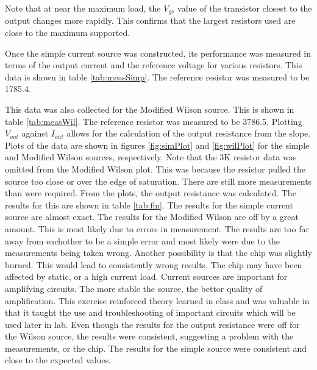 Note that at near the maximum load, the $V_{gs}$ value of the transistor closest to the output changes more rapidly. This confirms that the largest resistors used are close to the maximum supported. 

Once the simple current source was constructed, its performance was measured in terms of the output current and the reference voltage for various resistors. This data is shown in table \ref{tab:measSimp}. The reference resistor was measured to be 1785.4\ohm. 

This data was also collected for the Modified Wilson source. This is shown in table \ref{tab:measWil}. The reference resistor was measured to be 3786.5\ohm. 
Plotting $V_{out}$ against $I_{out}$ allows for the calculation of the output resistance from the slope. Plots of the data are shown in figures \ref{fig:simPlot} and \ref{fig:wilPlot} for the simple and Modified Wilson sources, respectively. 
Note that the 3K resistor data was omitted from the Modified Wilson plot. This was because the resistor pulled the source too close or over the edge of saturation. There are still more measurements than were required. 
From the plots, the output resistance was calculated. The results for this are shown in table \ref{tab:fin}.
The results for the simple current source are almost exact. The results for the  Modified Wilson are off by a great amount. This is most likely due to errors in measurement. The results are too far away from eachother to be a simple error and most likely were due to the measurements being taken wrong. 
Another possibility is that the chip was slightly burned. This would lead to consistently wrong results. The chip may have been affected by static, or a high current load. 
Current sources are important for amplifying circuits. The more stable the source, the bettor quality of amplification. This exercise reinforced theory learned in class and was valuable in that it taught the use and troubleshooting of important circuits which will be used later in lab. 
Even though the results for the output resistance were off for the Wilson source, the results were consistent, suggesting a problem with the measurements, or the chip. 
The results for the simple source were consistent and close to the expected values. 



